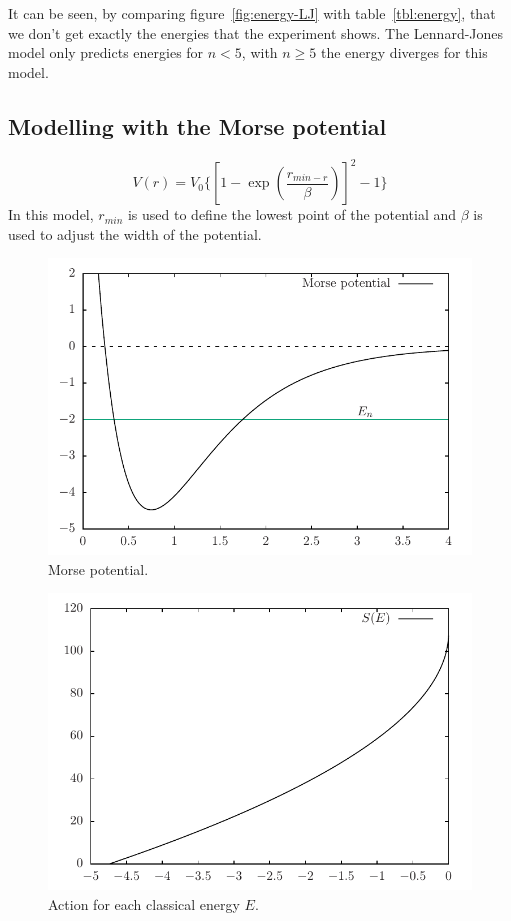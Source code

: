 \documentclass[11pt]{article}
\begin{document}
It can be seen, by comparing figure~\ref{fig:energy-LJ} with table~\ref{tbl:energy}, that we don't get exactly the energies that the experiment shows. The Lennard-Jones model only predicts energies for $n<5$, with $n\ge5$ the energy diverges for this model.

\subsection{Modelling with the Morse potential}
\begin{equation*}
  V(r) = V_0\Bigg\{\left[1-\exp{\left(\frac{r_{min-r}}{\beta}\right)}\right]^2-1 \Bigg\}
\end{equation*}
In this model, $r_{min}$ is used to define the lowest point of the potential and $\beta$ is used to adjust the width of the potential.
\begin{figure}[H]
  \centering
  \includegraphics[width=\linewidth]{potential-Morse}
  \caption{Morse potential.}
\label{fig:potential-Morse}
\end{figure}
\begin{figure}[H]
  \centering
  \includegraphics[width=\linewidth]{action-Morse}
  \caption{Action for each classical energy $E$.}
\label{fig:action-Morse}
\end{figure}
\end{document}
